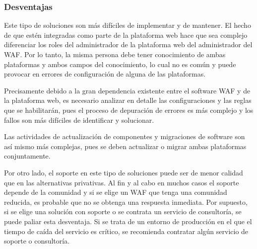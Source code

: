 \subsubsection{Desventajas}
\par Este tipo de soluciones son más difíciles de implementar y de mantener. El hecho de que estén integradas como parte de la plataforma web
hace que sea complejo diferenciar los roles del administrador de la plataforma web del administrador del WAF. Por lo tanto, la misma persona
debe tener conocimiento de ambas plataformas y ambos campos del conocimiento, lo cual no es común y puede provocar en errores de configuración
de alguna de las plataformas.
\par Precisamente debido a la gran dependencia existente entre el software WAF y de la plataforma web, es necesario analizar en detalle las
configuraciones y las reglas que se habilitarán, pues el proceso de depuración de errores es más complejo y los fallos son más difíciles de
identificar y solucionar.
\par Las actividades de actualización de componentes y migraciones de software son así mismo más complejas, pues se deben actualizar o migrar
ambas plataformas conjuntamente.
\par Por otro lado, el soporte en este tipo de soluciones puede ser de menor calidad que en las alternativas privativas. Al fin y al cabo en
muchos casos el soporte depende de la comunidad y si se elige un WAF que tenga una comunidad reducida, es probable que no se obtenga una
respuesta inmediata. Por supuesto, si se elige una solución con soporte o se contrata un servicio de consultoría, se puede paliar esta
desventaja. Si se trata de un entorno de producción en el que el tiempo de caída del servicio es crítico, se recomienda contratar algún
servicio de soporte o consultoría.

